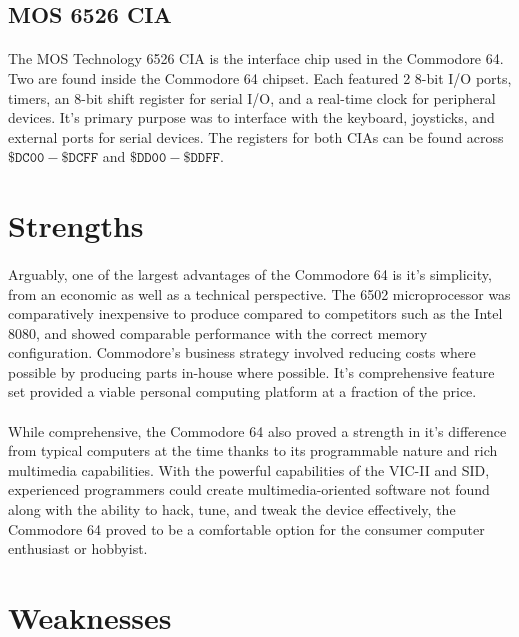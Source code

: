 \documentclass{article}
\begin{document}
\subsection{MOS 6526 CIA}
\paragraph{}
The MOS Technology 6526 CIA is the interface chip used in the Commodore 64. Two are found inside the Commodore 64 chipset. Each featured 2 8-bit I/O ports, timers, an 8-bit shift register for serial I/O, and a real-time clock for peripheral devices. It's primary purpose was to interface with the keyboard, joysticks, and external ports for serial devices. The registers for both CIAs can be found across $\mathtt{\$DC00 - \$DCFF}$ and $\mathtt{\$DD00 - \$DDFF}$.

\section{Strengths}
\paragraph{}
Arguably, one of the largest advantages of the Commodore 64 is it's simplicity, from an economic as well as a technical perspective. The 6502 microprocessor was comparatively inexpensive to produce compared to competitors such as the Intel 8080, and showed comparable performance with the correct memory configuration. Commodore's business strategy involved reducing costs where possible by producing parts in-house where possible. It's comprehensive feature set provided a viable personal computing platform at a fraction of the price.

\paragraph{}
While comprehensive, the Commodore 64 also proved a strength in it's difference from typical computers at the time thanks to its programmable nature and rich multimedia capabilities. With the powerful capabilities of the VIC-II and SID, experienced programmers could create multimedia-oriented software not found  along with the ability to hack, tune, and tweak the device effectively, the Commodore 64 proved to be a comfortable option for the consumer computer enthusiast or hobbyist. 

\section{Weaknesses}
\end{document}
